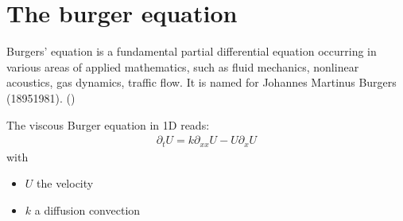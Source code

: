 \documentclass[letterpaper,10pt,english]{sphinxmanual}
\begin{document}
\noindent{}


\section{The burger equation}
\label{\detokenize{cookbook/burger_equation:the-burger-equation}}\label{\detokenize{cookbook/burger_equation::doc}}
\begin{sphinxVerbatim}[commandchars=\\\{\}]
   
   
 

   
   

   

      


 
\end{sphinxVerbatim}

Burgers' equation is a fundamental partial differential equation
occurring in various areas of applied mathematics, such as fluid
mechanics, nonlinear acoustics, gas dynamics, traffic flow. It is named
for Johannes Martinus Burgers (1895\textendash{}1981).
()

The viscous Burger equation in 1D reads:
\begin{equation*}
\begin{split}\partial_{t}U = k \partial_{xx} U - U \partial_{x} U\end{split}
\end{equation*}
with
\begin{itemize}
\item {} 
\(U\) the velocity

\item {} 
\(k\) a diffusion convection

\end{itemize}
\end{document}
